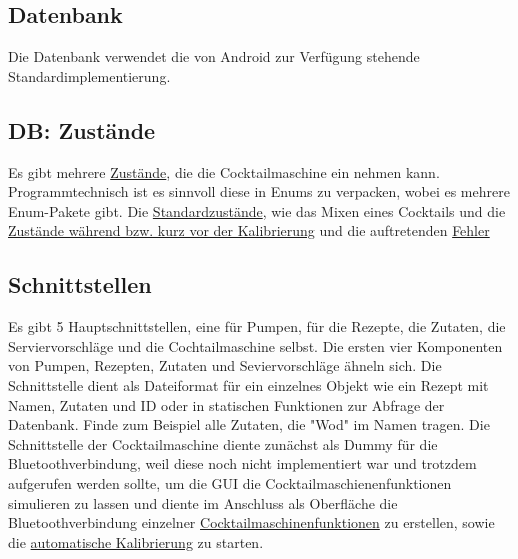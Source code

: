\subsection{Datenbank}

Die Datenbank verwendet die von Android zur Verfügung stehende Standardimplementierung. 


\subsection{DB: Zustände}

Es gibt mehrere \hyperref[sec:status]{Zustände}, die die Cocktailmaschine ein nehmen kann. Programmtechnisch ist es sinnvoll diese in Enums zu verpacken, wobei es mehrere Enum-Pakete gibt. Die \hyperref[sec:statusrez]{Standardzustände}, wie das Mixen eines Cocktails und die \hyperref[sec:statuscal]{Zustände während bzw. kurz vor der Kalibrierung} und die auftretenden \hyperref[sec:statuserror]{Fehler}



\subsection{Schnittstellen}


Es gibt 5 Hauptschnittstellen, eine für Pumpen, für die Rezepte, die Zutaten, die Serviervorschläge und die Cochtailmaschine selbst. 
Die ersten vier Komponenten von Pumpen, Rezepten, Zutaten und Seviervorschläge ähneln sich. Die Schnittstelle dient als Dateiformat für ein einzelnes Objekt wie ein Rezept mit Namen, Zutaten und ID oder in statischen Funktionen zur Abfrage der Datenbank. Finde zum Beispiel alle Zutaten, die "Wod" im Namen tragen. Die Schnittstelle der Cocktailmaschine diente zunächst als Dummy für die Bluetoothverbindung, weil diese noch nicht implementiert war und trotzdem aufgerufen werden sollte, um die GUI die Cocktailmaschienenfunktionen simulieren zu lassen und diente im Anschluss als Oberfläche die Bluetoothverbindung einzelner \hyperref[sec:espbefehle]{Cocktailmaschinenfunktionen} zu erstellen, sowie die \hyperref[sec:dioautokal]{automatische Kalibrierung} zu starten.
